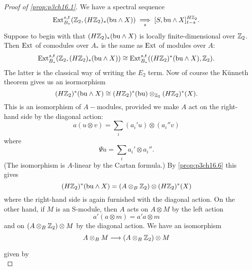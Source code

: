 \documentclass[../main]{subfiles}
\begin{document}
     \begin{proof}[Proof of \ref{prop:p3ch16.1}] We have a spectral sequence \begin{equation*}
            \mathrm{Ext}_{B_\ast}^{s, t} (\mathbb{Z}_2, (H\mathbb{Z}_2)_{\ast}(\mathrm{bu} \wedge X)) \underset{s}{\implies} [S, \mathrm{bu} \wedge X ]_{t-s}^{H\mathbb{Z}_2}.
     \end{equation*}
      Suppose to begin with that $(H\mathbb{Z}_2)_{\ast}(\mathrm{bu}\wedge X)$ is locally finite-dimensional over $\mathbb{Z}_2$. Then $\mathrm{Ext}$ of comodules over $A_{\ast}$ is the same as $\mathrm{Ext}$ of modules over $A$: \begin{equation*}
          \mathrm{Ext}_{B_\ast}^{s, t} (\mathbb{Z}_2, (H{\mathbb{Z}_2})_{\ast}(\mathrm{bu} \wedge X)) \cong \mathrm{Ext}_{B_\ast}^{s, t} ((H\mathbb{Z}_2)^{\ast}(\mathrm{bu}\wedge X), \mathbb{Z}_2). 
      \end{equation*}
      The latter is the classical way of writing the $E_{2}$ term. Now of course the Künneth theorem gives us an isormorphism \begin{equation*}
          (H\mathbb{Z}_2)^{\ast}(\mathrm{bu} \wedge X) \cong (H\mathbb{Z}_2)^{\ast}(\mathrm{bu})\otimes_{\mathbb{Z}_2}(H\mathbb{Z}_2)^{\ast}(X).
      \end{equation*}
      This is an isomorphism of $A-$modules, provided we make $A$ act on the
right-hand side by the diagonal action: \begin{equation*}
    a(u\otimes v)= \sum_{i}(a_{i}'u)\otimes(a_{i}''v)
\end{equation*}
where \begin{equation*}
    \Psi a = \sum_{i} a_{i}' \otimes a_{i}''.
\end{equation*}
(The isomorphism is $A$-linear by the Cartan formula.) By \ref{prop:p3ch16.6} this gives \begin{equation*}
    (H\mathbb{Z}_2)^{\ast}(\mathrm{bu} \wedge X)= (A \otimes_{B} \mathbb{Z}_2)\otimes(H\mathbb{Z}_2)^{\ast}(X) 
\end{equation*}
where the right-hand side is again furnished with the diagonal action. On
the other hand, if $M$ is an S-module, then $A$ acts on $A \otimes M$ by the left action \begin{equation*}
 a'(a\otimes m )= a'a \otimes m 
\end{equation*}
and on $(A \otimes_{B} \mathbb{Z}_2)\otimes M$ by the diagonal action. We have an isomorphism \begin{equation*}
    A \otimes_{B} M \lar{} (A \otimes_{B} \bZ_2)\otimes M
\end{equation*}
given by \begin{equation*}

\end{equation*}
\end{proof}
\end{document}
